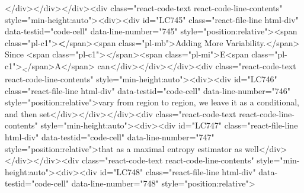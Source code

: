 {{{{{</div></div></div><div class="react-code-text react-code-line-contents" style="min-height:auto"><div><div id="LC745" class="react-file-line html-div" data-testid="code-cell" data-line-number="745" style="position:relative"><span class="pl-c1">\textbf</span>{<span class="pl-mb">Adding More Variability.</span>} Since <span class="pl-c1">\emph</span>{<span class="pl-mi">E<span class="pl-c1">\textsubscript</span>{A}</span>} can</div></div></div><div class="react-code-text react-code-line-contents" style="min-height:auto"><div><div id="LC746" class="react-file-line html-div" data-testid="code-cell" data-line-number="746" style="position:relative">vary from region to region, we leave it as a conditional, and then set</div></div></div><div class="react-code-text react-code-line-contents" style="min-height:auto"><div><div id="LC747" class="react-file-line html-div" data-testid="code-cell" data-line-number="747" style="position:relative">that as a maximal entropy estimator as well</div></div></div><div class="react-code-text react-code-line-contents" style="min-height:auto"><div><div id="LC748" class="react-file-line html-div" data-testid="code-cell" data-line-number="748" style="position:relative">
}}}}}
